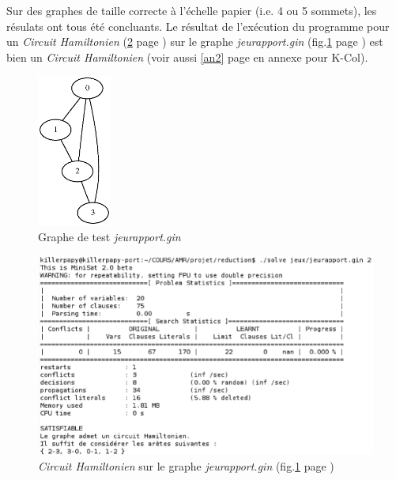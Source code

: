   \indent Sur des graphes de taille correcte à l'échelle papier (i.e. 4
  ou 5 sommets), les résulats ont tous été concluants. Le résultat de
  l'exécution du programme pour un \emph{Circuit Hamiltonien} (\ref{ham}
  page \pageref{ham}) sur le graphe \emph{jeurapport.gin}
  (fig.\ref{graphe1} page \pageref{graphe1}) est bien un \emph{Circuit
  Hamiltonien} (voir aussi \ref{an2} page \pageref{an2} en annexe pour
  K-Col).

  \begin{figure}[!ht]
   \begin{center}
    \includegraphics[height=5cm]{images/jeurap.ps}
    \caption{Graphe de test \emph{jeurapport.gin}\label{graphe1}}
   \end{center}
  \end{figure}

  \begin{figure}[!ht]
   \begin{center}
    \includegraphics[width=12cm]{images/chemin.eps}
    \caption{\emph{Circuit Hamiltonien} sur le graphe
    \emph{jeurapport.gin} (fig.\ref{graphe1} page
    \pageref{graphe1})\label{ham}}
   \end{center}
  \end{figure}